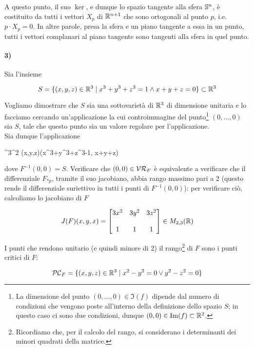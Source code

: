 A questo punto, il suo $ \ker $, e dunque lo spazio tangente alla sfera $ \S^{n} $, è costituito da tutti i vettori $ X_{p} $ di $ \R^{n+1} $ che sono ortogonali al punto $ p $, i.e. $ p \cdot X_{p} = 0 $. In altre parole, presa la sfera e un piano tangente a essa in un punto, tutti i vettori complanari al piano tangente sono tangenti alla sfera in quel punto.

\paragraph{3)}\label{ex:subvar-cond}

Sia l'insieme

\begin{equation}
	S = \{ (x,y,z) \in \R^{3} \mid x^{3} + y^{3} + z^{3} = 1 \wedge x+y+z=0 \} \subset \R^{3}
\end{equation}

Vogliamo dimostrare che $ S $ sia una sottovarietà di $ \R^{3} $ di dimensione unitaria e lo facciamo cercando un'applicazione la cui controimmagine del punto\footnote{%
	La dimensione del punto $ (0,\dots,0) \in \Im(f) $ dipende dal numero di condizioni che vengono poste all'interno della definizione dello spazio $ S $; in questo caso ci sono due condizioni, dunque $ (0,0) \in \Im(f) \subset \R^{2} $.%
} $ (0,\dots,0) $ sia $ S $, tale che questo punto sia un valore regolare per l'applicazione.\\
Sia dunque l'applicazione

	{\R^{3}}{\R^{2}}
	{(x,y,z)}{(x^{3}+y^{3}+z^{3}-1, x+y+z)}

dove $ F^{-1}(0,0) = S $. Verificare che $ (0,0) \in \VR_{F} $ è equivalente a verificare che il differenziale $ F_{*p} $, tramite il suo jacobiano, abbia rango massimo pari a 2 (questo rende il differenziale suriettivo in tutti i punti di $ F^{-1}(0,0) $): per verificare ciò, calcoliamo lo jacobiano di $ F $

\begin{equation}
	J(F)(x,y,x) = \bmqty{ 3x^{2} & 3y^{2} & 3z^{2} \\\\ 1 & 1 & 1 }\in M_{2,3}(\R)
\end{equation}

I punti che rendono unitario (e quindi minore di 2) il rango\footnote{%
	Ricordiamo che, per il calcolo del rango, si considerano i determinanti dei minori quadrati della matrice.%
} di $ F $ sono i punti critici di $ F $:

\begin{equation}
	\PC_{F} = \{ (x,y,z) \in \R^{3} \mid x^{2}-y^{2}=0 \lor y^{2}-z^{2}=0 \}
\end{equation}

